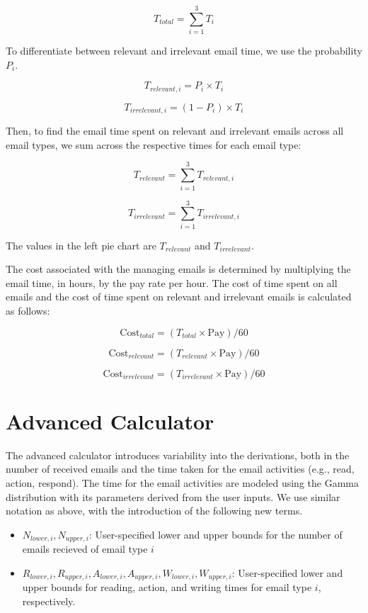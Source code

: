 \documentclass[
  reportpaper,
  DIV=11,
  numbers=noendperiod]{scrartcl}
\providecommand{\tightlist}{%
  \setlength{\itemsep}{0pt}\setlength{\parskip}{0pt}}\usepackage{longtable,booktabs,array}
\begin{document}
\[ T_{total} = \sum_{i=1}^{3} T_i \]

To differentiate between relevant and irrelevant email time, we use the
probability \(P_i\).

\[ T_{relevant,i} = P_i \times T_i \]

\[ T_{irrelevant,i} = (1 - P_i) \times T_i \]

Then, to find the email time spent on relevant and irrelevant emails
across all email types, we sum across the respective times for each
email type:

\[ T_{relevant} = \sum_{i=1}^{3} T_{relevant,i} \]

\[ T_{irrelevant} = \sum_{i=1}^{3} T_{irrelevant,i} \]

The values in the left pie chart are \(T_{relevant}\) and
\(T_{irrelevant}\).

The cost associated with the managing emails is determined by
multiplying the email time, in hours, by the pay rate per hour. The cost
of time spent on all emails and the cost of time spent on relevant and
irrelevant emails is calculated as follows:

\[ \text{Cost}_{total} = ( T_{total} \times \text{Pay} ) / 60\]

\[ \text{Cost}_{relevant} = ( T_{relevant} \times \text{Pay}  ) / 60\]

\[ \text{Cost}_{irrelevant} = ( T_{irrelevant} \times \text{Pay}  ) / 60\]

\newpage{}

\section{Advanced Calculator}\label{advanced-calculator}

The advanced calculator introduces variability into the derivations,
both in the number of received emails and the time taken for the email
activities (e.g., read, action, respond). The time for the email
activities are modeled using the Gamma distribution with its parameters
derived from the user inputs. We use similar notation as above, with the
introduction of the following new terms.

\begin{itemize}
\tightlist
\item
  \(N_{lower,i}, N_{upper,i}\): User-specified lower and upper bounds
  for the number of emails recieved of email type \(i\)
\item
  \(R_{lower,i}, R_{upper,i}, A_{lower,i}, A_{upper,i}, W_{lower,i}, W_{upper,i}\):
  User-specified lower and upper bounds for reading, action, and writing
  times for email type \(i\), respectively.
\end{itemize}
\end{document}
